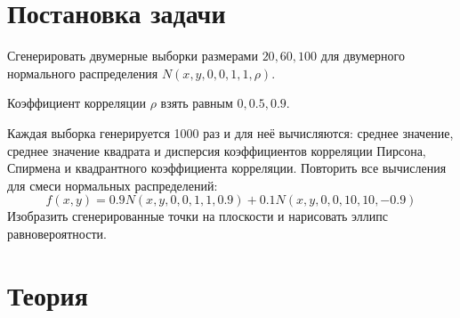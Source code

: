 \documentclass[a4]{article}
\renewcommand{\listoffigures}{\begingroup %
\tocsection
\tocfile{\listfigurename}{lof}
\endgroup}
\renewcommand{\listoftables}{\begingroup %
\tocsection
\tocfile{\listtablename}{lot}
\endgroup}
\begin{document}



\newpage
\tableofcontents{}
\newpage
\listoffigures{}
\listoftables{}
\newpage

\section{Постановка задачи}

Сгенерировать двумерные выборки размерами $20, 60, 100$ для двумерного нормального распределения $ N(x,y,0,0,1,1,\rho) $.
\par Коэффициент корреляции $\rho$ взять равным $0, 0.5, 0.9$.
\par Каждая выборка генерируется 1000 раз и для неё вычисляются: среднее значение, среднее значение квадрата и дисперсия коэффициентов корреляции Пирсона, Спирмена и квадрантного коэффициента корреляции.
Повторить все вычисления для смеси нормальных распределений: 
\begin{equation}
    f(x,y) = 0.9N(x,y,0,0,1,1,0.9)+0.1N(x,y,0,0,10,10,-0.9)
\end{equation}
Изобразить сгенерированные точки на плоскости и нарисовать эллипс равновероятности.


\section{Теория}
\end{document}
